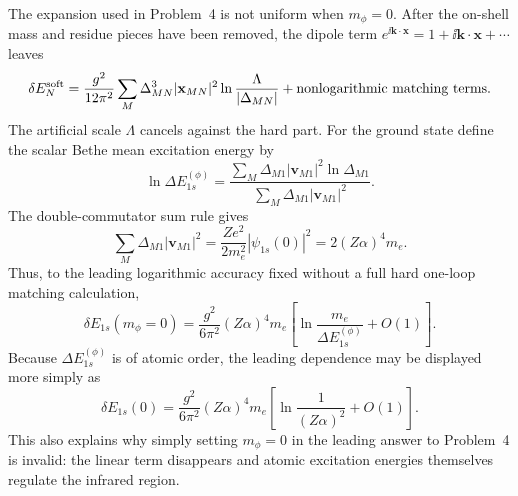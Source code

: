 \begin{enumerate}
The expansion used in Problem~4 is not uniform when \(m_\phi=0\).  After
the on-shell mass and residue pieces have been removed, the dipole term
\(e^{\ii\mathbf k\cdot\mathbf x}=1+\ii\mathbf k\cdot\mathbf x+\cdots\)
leaves
\[
 \delta E_N^{\rm soft}
 =\frac{g^2}{12\pi^2}\sum_M
 \Delta_{MN}^3|\mathbf x_{MN}|^2
 \ln\frac{\Lambda}{|\Delta_{MN}|}
 +\hbox{nonlogarithmic matching terms}.
\]
The artificial scale \(\Lambda\) cancels against the hard part.  For the
ground state define the scalar Bethe mean excitation energy by
\[
 \ln\Delta E_{1s}^{(\phi)}
 =\frac{\sum_M\Delta_{M1}|\mathbf v_{M1}|^2
                  \ln\Delta_{M1}}
        {\sum_M\Delta_{M1}|\mathbf v_{M1}|^2}.
\]
The double-commutator sum rule gives
\[
 \sum_M\Delta_{M1}|\mathbf v_{M1}|^2
 =\frac{Ze^2}{2m_e^2}|\psi_{1s}(0)|^2
 =2(Z\alpha)^4m_e .
\]
Thus, to the leading logarithmic accuracy fixed without a full hard
one-loop matching calculation,
\[
 \delta E_{1s}(m_\phi=0)
 =\frac{g^2}{6\pi^2}(Z\alpha)^4m_e
 \left[\ln\frac{m_e}{\Delta E_{1s}^{(\phi)}}+O(1)\right].
\]
Because \(\Delta E_{1s}^{(\phi)}\) is of atomic order, the leading
dependence may be displayed more simply as
\[
 \boxed{\displaystyle
 \delta E_{1s}(0)=\frac{g^2}{6\pi^2}(Z\alpha)^4m_e
 \left[\ln\frac1{(Z\alpha)^2}+O(1)\right].}
\]
This also explains why simply setting \(m_\phi=0\) in the leading answer to
Problem~4 is invalid: the linear term disappears and atomic excitation
energies themselves regulate the infrared region.
\end{enumerate}
